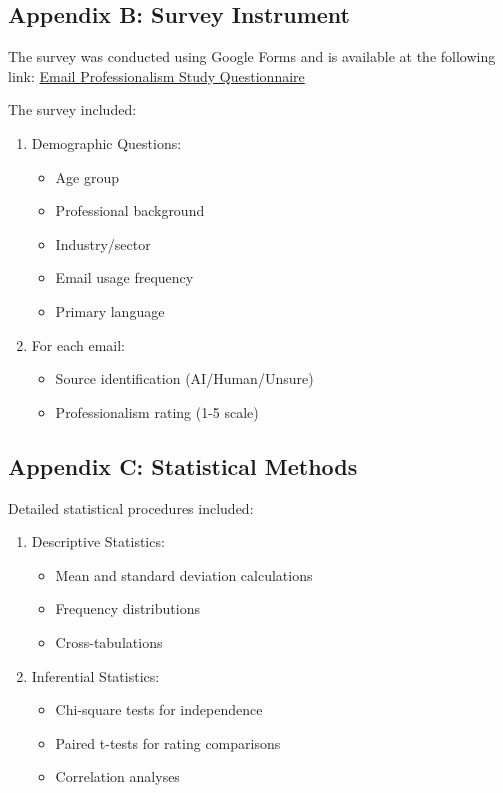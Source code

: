 \documentclass[
]{article}
\providecommand{\tightlist}{%
  \setlength{\itemsep}{0pt}\setlength{\parskip}{0pt}}\usepackage{longtable,booktabs,array}
\begin{document}
\subsection{Appendix B: Survey
Instrument}\label{appendix-b-survey-instrument}

The survey was conducted using Google Forms and is available at the
following link:
\href{https://docs.google.com/forms/d/e/1FAIpQLSeb-7fgi9-pYoLTwQS9BhUcwpGYxNoAVz20g9WyYCUdVvJXDQ/viewform?usp=header}{Email
Professionalism Study Questionnaire}

The survey included:

\begin{enumerate}
\def\labelenumi{\arabic{enumi}.}
\tightlist
\item
  Demographic Questions:

  \begin{itemize}
  \tightlist
  \item
    Age group
  \item
    Professional background
  \item
    Industry/sector
  \item
    Email usage frequency
  \item
    Primary language
  \end{itemize}
\item
  For each email:

  \begin{itemize}
  \tightlist
  \item
    Source identification (AI/Human/Unsure)
  \item
    Professionalism rating (1-5 scale)
  \end{itemize}
\end{enumerate}

\subsection{Appendix C: Statistical
Methods}\label{appendix-c-statistical-methods}

Detailed statistical procedures included:

\begin{enumerate}
\def\labelenumi{\arabic{enumi}.}
\tightlist
\item
  Descriptive Statistics:

  \begin{itemize}
  \tightlist
  \item
    Mean and standard deviation calculations
  \item
    Frequency distributions
  \item
    Cross-tabulations
  \end{itemize}
\item
  Inferential Statistics:

  \begin{itemize}
  \tightlist
  \item
    Chi-square tests for independence
  \item
    Paired t-tests for rating comparisons
  \item
    Correlation analyses
  \end{itemize}
\end{enumerate}
\end{document}
